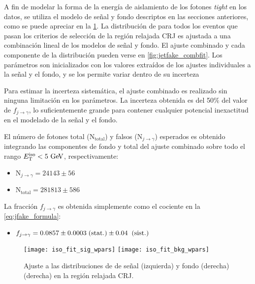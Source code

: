 A fin de modelar la forma de la energía de aislamiento de los fotones \emph{tight} en los datos,
se utiliza el modelo de señal y fondo descriptos en las secciones anteriores, como se puede
apreciar en la \cref{fig:jetfake_sigbkg}.
La distribución de {\etiso} para todos los eventos que pasan los criterios de
selección de la región relajada CRJ es ajustada a una combinación lineal de
los modelos de señal y fondo. El ajuste combinado y cada componente de la
distribución pueden verse en \cref{fig:jetfake_combfit}. Los parámetros son
inicializados con los valores extraídos de los ajustes individuales a la señal y
el fondo, y se los permite variar dentro de su incerteza


Para estimar la incerteza sistemática, el ajuste combinado es realizado
sin ninguna limitación en los parámetros. La incerteza obtenida es del
50\% del valor de $f_{j\to\gamma}$, lo suficientemente grande para contener
cualquier potencial inexactitud en el modelado de la señal y el fondo.


El número de fotones total (N$_\text{total}$) y falsos
(N$_{j\to\gamma}$) esperados es obtenido
integrando las componentes de fondo y total del ajuste combinado sobre todo el
rango $\etiso<5\gev$, respectivamente:

\begin{itemize}
\item[] N$_{j\to\gamma}= 24143 \pm 56$

\item[] N$_\text{total} = 281813 \pm 586$
\end{itemize}

La fracción $f_{j\to \gamma}$ es obtenida simplemente como el cociente
en la \cref{eq:jfake_formula}:

\begin{itemize}
\item[] $f_{j\rightarrow\gamma} = 0.0857 \pm 0.0003 \mbox{$\;$(stat.)} \pm 0.04 \;\mbox{$\;$(sist.)}$
\end{itemize}

\begin{figure}[!htb]
  \centering

  \texttt{[image: iso\_fit\_sig\_wpars]}  \hfill
  \texttt{[image: iso\_fit\_bkg\_wpars]}

  \caption{Ajuste a las distribuciones de {\etiso} de señal
    (izquierda) y fondo (derecha) (derecha) en la región
    relajada CRJ.}
  \label{fig:jetfake_sigbkg}

\end{figure}

